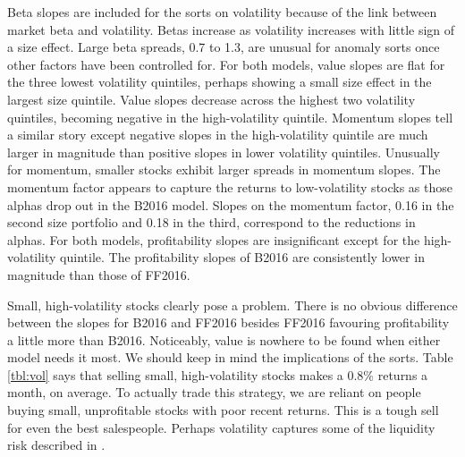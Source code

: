 Beta slopes are included for the sorts on volatility because of the link between market
beta and volatility. Betas increase as volatility increases with little sign of a size
effect. Large beta spreads, 0.7 to 1.3, are unusual for anomaly sorts once other factors
have been controlled for. For both models, value slopes are flat for the three lowest
volatility quintiles, perhaps showing a small size effect in the largest size quintile.
Value slopes decrease across the highest two volatility quintiles, becoming negative in
the high-volatility quintile. Momentum slopes tell a similar story except negative slopes
in the high-volatility quintile are much larger in magnitude than positive slopes in lower
volatility quintiles. Unusually for momentum, smaller stocks exhibit larger spreads in
momentum slopes. The momentum factor appears to capture the returns to low-volatility
stocks as those alphas drop out in the B2016 model. Slopes on the momentum factor, 0.16 in
the second size portfolio and 0.18 in the third, correspond to the reductions in alphas.
For both models, profitability slopes are insignificant except for the high-volatility
quintile. The profitability slopes of B2016 are consistently lower in magnitude than those
of FF2016.

Small, high-volatility stocks clearly pose a problem. There is no obvious difference
between the slopes for B2016 and FF2016 besides FF2016 favouring profitability a little
more than B2016. Noticeably, value is nowhere to be found when either model needs it most.
We should keep in mind the implications of the sorts. Table \ref{tbl:vol} says that
selling small, high-volatility stocks makes a 0.8\% returns a month, on average. To
actually trade this strategy, we are reliant on people buying small, unprofitable stocks
with poor recent returns. This is a tough sell for even the best salespeople. Perhaps
volatility captures some of the liquidity risk described in \textcite{nagel2005short}.
